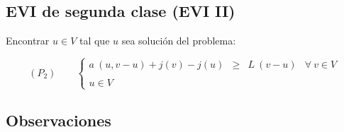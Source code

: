 \subsection{EVI de segunda clase (EVI II)}

Encontrar $u \in V$ tal que $u$ sea soluci\'on del problema:

\begin{equation} \label{eq:EVI1}
(P_2) \qquad \left\{ \begin{array}{lrlr}
a \ (u,v-u) + j(v)-j(u) & \ge & L \ (v-u) & \forall \ v \in V \\
\\
u \in V
\end{array} \right.
\end{equation}

\subsection{Observaciones}

